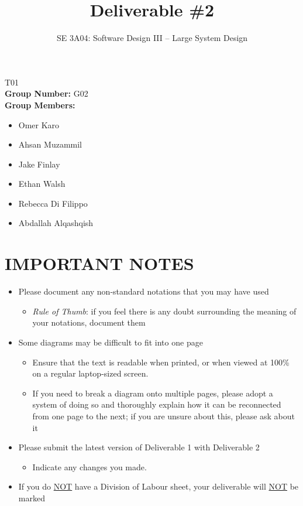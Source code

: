 \documentclass[]{article}
\title{Deliverable \#2}
\author{SE 3A04: Software Design III -- Large System Design}
\date{}
\begin{document}
\maketitle
{} T01\\
{\bf Group Number:} G02 \\
{\bf Group Members:}
\begin{itemize}
  \item Omer Karo
  \item Ahsan Muzammil
  \item Jake Finlay
  \item Ethan Walsh
  \item Rebecca Di Filippo
  \item Abdallah Alqashqish
\end{itemize}

\section*{IMPORTANT NOTES}
\begin{itemize}
  \item Please document any non-standard notations that you may have used
        \begin{itemize}
          \item \emph{Rule of Thumb}: if you feel there is any doubt surrounding the meaning of your notations, document them
        \end{itemize}
  \item Some diagrams may be difficult to fit into one page
        \begin{itemize}
          \item Ensure that the text is readable when printed, or when viewed at 100\% on a regular laptop-sized screen.
          \item If you need to break a diagram onto multiple pages, please adopt a system of doing so and thoroughly explain how it can be reconnected from one page to the next; if you are unsure about this, please ask about it
        \end{itemize}
  \item Please submit the latest version of Deliverable 1 with Deliverable 2
        \begin{itemize}
          \item Indicate any changes you made.
        \end{itemize}
  \item If you do \underline{NOT} have a Division of Labour sheet, your deliverable will \underline{NOT} be marked
\end{itemize}
\end{document}
